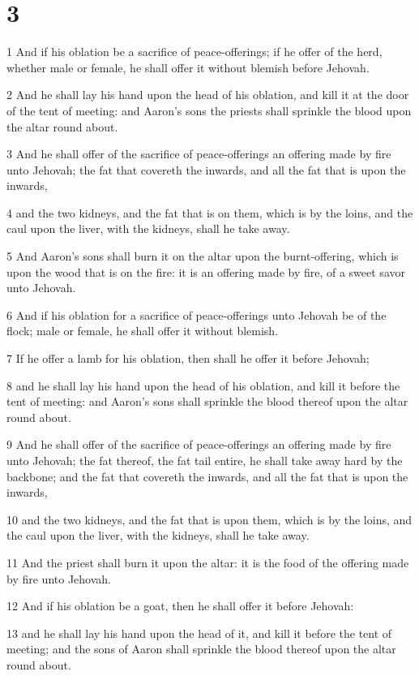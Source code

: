\chapter{3}

\par 1 And if his oblation be a sacrifice of peace-offerings; if he offer of the herd, whether male or female, he shall offer it without blemish before Jehovah.
\par 2 And he shall lay his hand upon the head of his oblation, and kill it at the door of the tent of meeting: and Aaron's sons the priests shall sprinkle the blood upon the altar round about.
\par 3 And he shall offer of the sacrifice of peace-offerings an offering made by fire unto Jehovah; the fat that covereth the inwards, and all the fat that is upon the inwards,
\par 4 and the two kidneys, and the fat that is on them, which is by the loins, and the caul upon the liver, with the kidneys, shall he take away.
\par 5 And Aaron's sons shall burn it on the altar upon the burnt-offering, which is upon the wood that is on the fire: it is an offering made by fire, of a sweet savor unto Jehovah.
\par 6 And if his oblation for a sacrifice of peace-offerings unto Jehovah be of the flock; male or female, he shall offer it without blemish.
\par 7 If he offer a lamb for his oblation, then shall he offer it before Jehovah;
\par 8 and he shall lay his hand upon the head of his oblation, and kill it before the tent of meeting: and Aaron's sons shall sprinkle the blood thereof upon the altar round about.
\par 9 And he shall offer of the sacrifice of peace-offerings an offering made by fire unto Jehovah; the fat thereof, the fat tail entire, he shall take away hard by the backbone; and the fat that covereth the inwards, and all the fat that is upon the inwards,
\par 10 and the two kidneys, and the fat that is upon them, which is by the loins, and the caul upon the liver, with the kidneys, shall he take away.
\par 11 And the priest shall burn it upon the altar: it is the food of the offering made by fire unto Jehovah.
\par 12 And if his oblation be a goat, then he shall offer it before Jehovah:
\par 13 and he shall lay his hand upon the head of it, and kill it before the tent of meeting; and the sons of Aaron shall sprinkle the blood thereof upon the altar round about.
